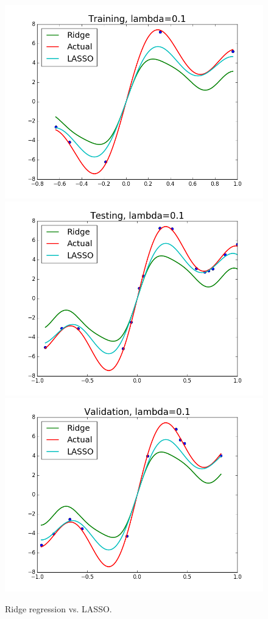 \documentclass{article}
\begin{document}
\begin{figure}[width=\linewidth]
\centering
\begin{multicols}{2}
  \includegraphics[width=1.2\linewidth]{code/P4/training,ridge.png}
  \includegraphics[width=1.2\linewidth]{code/P4/testing,ridge.png}
  \includegraphics[width=1.2\linewidth]{code/P4/validation,ridge.png}
\end{multicols}
\caption{Ridge regression vs. LASSO.}
\end{figure}
\end{document}
